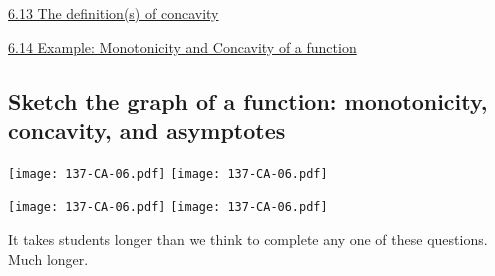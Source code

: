 \documentclass[11pt]{article}
\newcommand{\vxiii}{\hspace{8mm} \href{https://www.youtube.com/watch?v=4Dh6KdQDRkw&list=PLlwePzQY_wW9EsqbQzPdJTNGsHYvO_2CJ&index=13}{6.13 The definition(s) of concavity}}
\newcommand{\vxiv}{\hspace{8mm} \href{https://www.youtube.com/watch?v=ZodaIjLuhI8&list=PLlwePzQY_wW9EsqbQzPdJTNGsHYvO_2CJ&index=14}{6.14 Example: Monotonicity and Concavity of a function}}
\begin{document}
\begin{videos}
\vxiii

\vxiv
\end{videos}

\newpage

\subsection{Sketch the graph of a function: monotonicity, concavity, and asymptotes}

\begin{center}
{ \texttt{[image: 137-CA-06.pdf]}} \quad
{ \texttt{[image: 137-CA-06.pdf]}}

{ \texttt{[image: 137-CA-06.pdf]}} \quad
{ \texttt{[image: 137-CA-06.pdf]}}
\end{center}

\begin{warning}
It takes students longer than we think to complete any one of these questions.    Much longer.
\end{warning}
\end{document}
